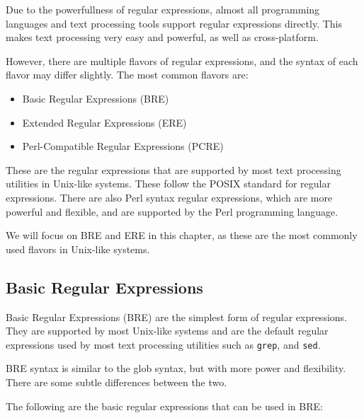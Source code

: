 Due to the powerfullness of regular expressions, almost all programming
languages and text processing tools support regular expressions directly.
This makes text processing very easy and powerful, as well as cross-platform.

However, there are multiple flavors of regular expressions, and the syntax
of each flavor may differ slightly. The most common flavors are:

\begin{itemize}
    \item Basic Regular Expressions (BRE)
    \item Extended Regular Expressions (ERE)
    \item Perl-Compatible Regular Expressions (PCRE)
\end{itemize}

These are the regular expressions that are supported by most text processing
utilities in Unix-like systems. These follow the POSIX standard for regular
expressions.
There are also Perl syntax regular expressions,
which are more powerful and flexible, and are supported by the Perl programming
language.

We will focus on BRE and ERE in this chapter, as these are the most commonly
used flavors in Unix-like systems.

\subsection{Basic Regular Expressions}

Basic Regular Expressions (BRE) are the simplest form of regular expressions.
They are supported by most Unix-like systems and are the default regular
expressions used by most text processing utilities such as \lstinline|grep|,
and \lstinline|sed|.

BRE syntax is similar to the glob syntax, but with more power and flexibility.
There are some subtle differences between the two.

The following are the basic regular expressions that can be used in BRE:

